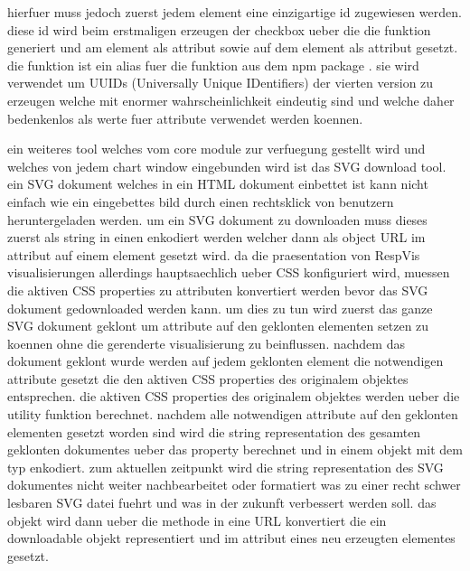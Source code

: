hierfuer muss jedoch zuerst jedem  element eine einzigartige id zugewiesen werden.
diese id wird beim erstmaligen erzeugen der checkbox ueber die die  funktion generiert und am  element als  attribut sowie auf dem  element als  attribut gesetzt.
die  funktion ist ein alias fuer die  funktion aus dem  npm package \parencite{UUIDPackage}.
sie wird verwendet um UUIDs (Universally Unique IDentifiers) \parencite{UUIDRFC} der vierten version zu erzeugen welche mit enormer wahrscheinlichkeit eindeutig sind und welche daher bedenkenlos als werte fuer  attribute verwendet werden koennen.

ein weiteres tool welches vom core module zur verfuegung gestellt wird und welches von jedem chart window eingebunden wird ist das SVG download tool.
ein SVG dokument welches in ein HTML dokument einbettet ist kann nicht einfach wie ein eingebettes bild durch einen rechtsklick von benutzern heruntergeladen werden.
um ein SVG dokument zu downloaden muss dieses zuerst als string in einen  enkodiert werden welcher dann als object URL im  attribut auf einem  element gesetzt wird.
da die praesentation von RespVis visualisierungen allerdings hauptsaechlich ueber CSS konfiguriert wird, muessen die aktiven CSS properties zu attributen konvertiert werden bevor das SVG dokument gedownloaded werden kann.
um dies zu tun wird zuerst das ganze SVG dokument geklont um attribute auf den geklonten elementen setzen zu koennen ohne die gerenderte visualisierung zu beinflussen.
nachdem das dokument geklont wurde werden auf jedem geklonten element die notwendigen attribute gesetzt die den aktiven CSS properties des originalem objektes entsprechen.
die aktiven CSS properties des originalem objektes werden ueber die  utility funktion berechnet.
nachdem alle notwendigen attribute auf den geklonten elementen gesetzt worden sind wird die string representation des gesamten geklonten dokumentes ueber das  property berechnet und in einem  objekt mit dem typ  enkodiert.
zum aktuellen zeitpunkt wird die string representation des SVG dokumentes nicht weiter nachbearbeitet oder formatiert was zu einer recht schwer lesbaren SVG datei fuehrt und was in der zukunft verbessert werden soll. 
das  objekt wird dann ueber die  methode in eine URL konvertiert die ein downloadable  objekt representiert und im  attribut eines neu erzeugten  elementes gesetzt.
